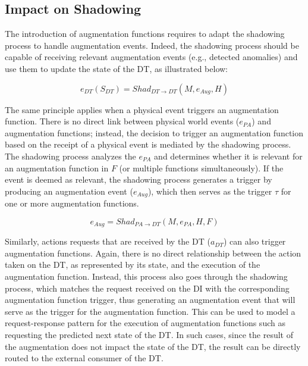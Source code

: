 \subsection{Impact on Shadowing}

The introduction of augmentation functions requires to adapt the shadowing process to handle augmentation events. Indeed, the shadowing process should be capable of receiving relevant augmentation events (e.g., detected anomalies) and use them to update the state of the DT, as illustrated below:

\begin{equation}
    e_{DT}(S_{DT}) = Shad_{DT \rightarrow DT}(M, e_{Aug}, H)
\end{equation}

The same principle applies when a physical event triggers an augmentation function. There is no direct link between physical world events (\( e_{PA} \)) and augmentation functions; 
instead, the decision to trigger an augmentation function based on the receipt of a physical event is mediated by the shadowing process.
The shadowing process analyzes the \( e_{PA} \) and determines whether it is relevant for an augmentation function in $F$ (or multiple functions simultaneously).  If the event is deemed as relevant, the shadowing process generates a trigger by producing an augmentation event (\( e_{Aug} \)), which then serves as the trigger \( \tau \) for one or more augmentation functions.

\begin{equation}
    e_{Aug} = Shad_{PA \rightarrow DT}(M, e_{PA}, H, F)
\end{equation}


Similarly, actions requests that are received by the \ac{DT} ($a_{DT}$) can also trigger augmentation functions.
Again, there is no direct relationship between the action taken on the DT, as represented by its state, and the execution of the augmentation function. Instead, this process also goes through the shadowing process, which matches the request received on the \ac{DI} with the corresponding augmentation function trigger, thus generating an augmentation event that will serve as the trigger for the augmentation function.
This can be used to model a request-response pattern for the execution of augmentation functions such as requesting the predicted next state of the \ac{DT}. In such cases, since the result of the augmentation does not impact the state of the \ac{DT}, the result can be directly routed to the external consumer of the \ac{DT}.

